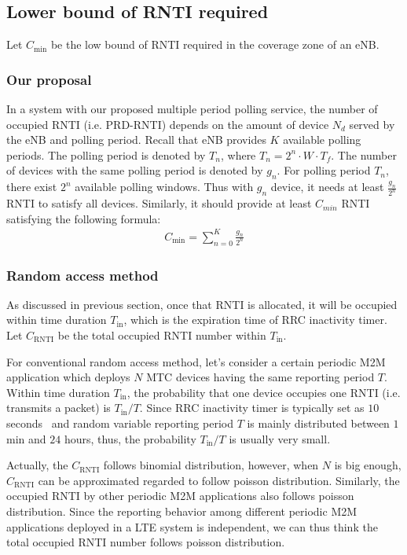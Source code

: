 \subsection{Lower bound of RNTI required}
Let $C_{\text{min}}$ be the low bound of RNTI required in the coverage zone of an eNB.

\subsubsection{Our proposal}
In a system with our proposed multiple period polling service, the number of occupied RNTI (i.e. PRD-RNTI) depends on the amount of device $N_d$ served by the eNB and polling period. Recall that eNB provides $K$ available polling periods. The polling period is denoted by $T_{n}$, where $T_n = 2^n \cdot W \cdot T_f$. The number of devices with the same polling period is denoted by $g_{n}$. For polling period $T_n$, there exist $2^n$ available polling windows. Thus with $g_n$ device, it needs at least $\frac{g_n}{2^n}$ RNTI to satisfy all devices. Similarly, it should provide at least $C_{min}$ RNTI satisfying the following formula:  
\begin{align}	
 C_{\text{min}} = \sum_{n=0}^{K} \frac{g_n}{2^n} \label{eq:lower-bound}
\end{align}

\subsubsection{Random access method}
As discussed in previous section, once that RNTI is allocated, it will be occupied within time duration $T_{\text{in}}$, which is the expiration time of RRC inactivity timer. Let $C_{\text{RNTI}}$ be the total occupied RNTI number within $T_{\text{in}}$.

For conventional random access method, let's consider a certain periodic M2M application which deploys $N$ MTC devices having the same reporting period $T$. Within time duration $T_{\text{in}}$, the probability that one device occupies one RNTI (i.e. transmits a packet) is $T_{\text{in}}/T$. Since RRC inactivity timer is typically set as $10$ seconds~\cite{scjha2014} and random variable reporting period $T$ is mainly distributed between $1$ min and $24$ hours, thus, the probability $T_{\text{in}}/T$ is usually very small.

Actually, the $C_{\text{RNTI}}$ follows binomial distribution, however, when $N$ is big enough, $C_{\text{RNTI}}$ can be approximated regarded to follow poisson distribution. Similarly, the occupied RNTI by other periodic M2M applications also follows poisson distribution.
Since the reporting behavior among different periodic M2M applications deployed in a LTE system is independent, we can thus think the total occupied RNTI number follows poisson distribution.

